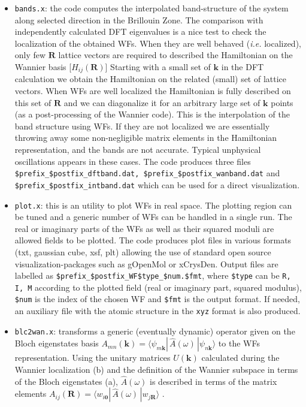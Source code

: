 %
%
\begin{itemize}
%
\item {\tt bands.x}: the code computes the interpolated band-structure
      of the system along selected direction in the Brillouin Zone.
      The comparison with independently calculated DFT eigenvalues is
      a nice test to check the localization of the obtained WFs.
      When they are well behaved ({\it i.e.} localized), only few $\mathbf{R}$ lattice
      vectors are required to described the Hamiltonian on the Wannier basis
      [$H_{ij}(\mathbf{R})$]
      Starting with a small set of $\mathbf{k}$ in the DFT calculation
      we obtain the Hamiltonian on the related (small) set of lattice vectors.
      When WFs are well localized
      the Hamiltonian is fully described on this set of $\mathbf{R}$ and we can
      diagonalize it for an arbitrary large set of $\mathbf{k}$ points
      (as a post-processing of the Wannier code). This is the
      interpolation of the band structure using WFs. If they are not localized
      we are essentially throwing away some non-negligible matrix elements
      in the Hamiltonian representation, and the bands
      are not accurate. Typical unphysical oscillations appears in these cases.
      The code produces three files {\tt \$prefix\_\$postfix\_dftband.dat,
      \$prefix\_\$postfix\_wanband.dat} and {\tt \$prefix\_\$postfix\_intband.dat}
      which can be used for a direct visualization.

\item {\tt plot.x}: this is an utility to plot WFs in real space.
      The plotting region can be tuned and a generic number of WFs can be
      handled in a single run.
      The real or imaginary parts of the WFs as well as their squared moduli are
      allowed fields to be plotted.
      The code produces plot files in various formats (txt, gaussian cube, xsf, plt)
      allowing the use of standard open source visualization-packages
      such as gOpenMol or xCrysDen. Output files are labelled as
      {\tt \$prefix\_\$postfix\_WF\$type\_\$num.\$fmt}, where {\tt \$type} can be
      {\tt R, I, M} according to the plotted field (real or imaginary part, squared
      modulus), {\tt \$num} is the index of the chosen WF and {\tt \$fmt} is the
      output format. If needed, an auxiliary file with the atomic structure
      in the {\tt xyz} format is also produced.
\item {\tt blc2wan.x}: transforms a generic (eventually dynamic) operator
      given on the Bloch eigenstates basis $A_{mn}(\mathbf{k}) =
      \langle \psi_{m\mathbf{k}} |\, \widehat{A}(\omega) \,|
      \psi_{n\mathbf{k}} \rangle$ to the WFs representation.
      Using the unitary matrices $U(\mathbf{k})$ calculated during the Wannier localization
      (b) and the definition of the Wannier subspace in terms of the Bloch eigenstates
      (a), $\widehat{A}(\omega)$ is described in terms of the matrix elements
      $A_{ij}(\mathbf{R}) = \langle w_{i\mathbf{0}} |\, \widehat{A}(\omega) \,|
      w_{j\mathbf{R}} \rangle$ .
\end{itemize}

